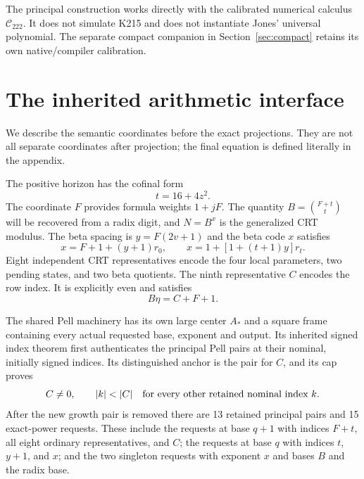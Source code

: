 \documentclass[11pt,a4paper]{article}
\theoremstyle{remark}\newtheorem{remark}[theorem]{Remark}
\newcommand{\Ccal}{\mathcal C_{222}}
\begin{document}
The principal construction works directly with the calibrated numerical
calculus $\Ccal$. It does not simulate K215 and does not instantiate Jones'
universal polynomial. The separate compact companion in
Section~\ref{sec:compact} retains its own native/compiler calibration.

\section{The inherited arithmetic interface}\label{sec:interface}

We describe the semantic coordinates before the exact projections. They are
not all separate coordinates after projection; the final equation is defined
literally in the appendix.

The positive horizon has the cofinal form
\begin{equation}\label{eq:horizon}
t=16+4z^2.
\end{equation}
The coordinate $F$ provides formula weights $1+jF$. The quantity
$B=\binom{F+t}{t}$ will be recovered from a radix digit, and $N=B^x$ is the
generalized CRT modulus. The beta spacing is $y=F(2v+1)$ and the beta code
$x$ satisfies
\begin{equation}\label{eq:betaend}
x=F+1+(y+1)r_0,
\qquad x=1+[1+(t+1)y]r_t.
\end{equation}
Eight independent CRT representatives encode the four local parameters, two
pending states, and two beta quotients. The ninth representative $C$ encodes
the row index. It is explicitly even and satisfies
\begin{equation}\label{eq:selector}
B\eta=C+F+1.
\end{equation}

The shared Pell machinery has its own large center $A_*$ and a square frame
containing every actual requested base, exponent and output. Its inherited
signed index theorem first authenticates the principal Pell pairs at their
nominal, initially signed indices. Its distinguished anchor is the pair for
$C$, and its cap proves
\begin{equation}\label{eq:cap}
C\ne0,\qquad |k|<|C|\quad\hbox{for every other retained nominal index }k.
\end{equation}
After the new growth pair is removed there are 13 retained principal pairs
and 15 exact-power requests. These include the requests at base $q+1$ with
indices $F+t$, all eight ordinary representatives, and $C$; the requests at
base $q$ with indices $t$, $y+1$, and $x$; and the two singleton requests
with exponent $x$ and bases $B$ and the radix base.
\end{document}
